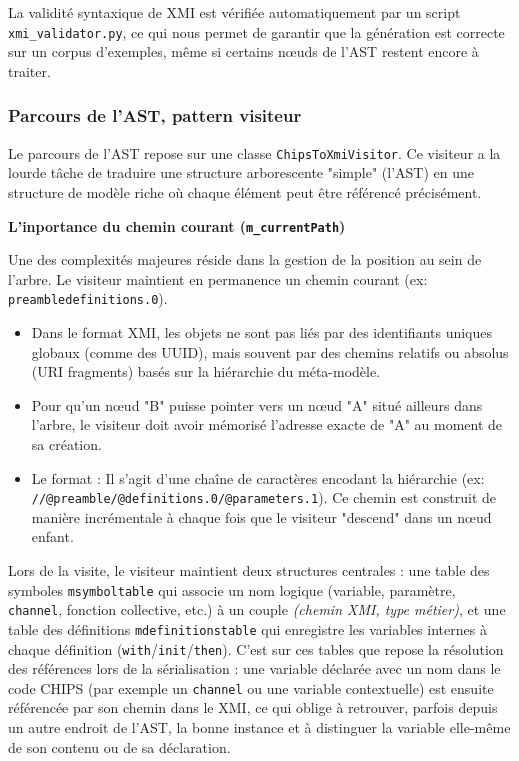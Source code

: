 \documentclass[a4paper, 11pt]{article}
\DeclareRobustCommand{\prog}[1]{\begingroup\urlstyle{tt}\nolinkurl{#1}\endgroup}
\begin{document}
La validité syntaxique de XMI est vérifiée automatiquement par un script \prog{xmi\_validator.py}, ce qui nous permet de garantir que la génération est correcte sur un corpus d’exemples, même si certains nœuds de l’AST restent encore à traiter.

\subsubsection{Parcours de l'AST, pattern visiteur}

Le parcours de l'AST repose sur une classe \prog{ChipsToXmiVisitor}. Ce visiteur a la lourde tâche de traduire une structure arborescente "simple" (l'AST) en une structure de modèle riche où chaque élément peut être référencé précisément.

\textbf{L'inportance du chemin courant (\prog{m\_currentPath})}

Une des complexités majeures réside dans la gestion de la position au sein de l'arbre. Le visiteur maintient en permanence un chemin courant (ex: \prog{preambledefinitions.0}).

\begin{itemize}
    \item Dans le format XMI, les objets ne sont pas liés par des identifiants uniques globaux (comme des UUID), mais souvent par des chemins relatifs ou absolus (URI fragments) basés sur la hiérarchie du méta-modèle.
    \item Pour qu'un nœud "B" puisse pointer vers un nœud "A" situé ailleurs dans l'arbre, le visiteur doit avoir mémorisé l'adresse exacte de "A" au moment de sa création.
    \item Le format : Il s'agit d'une chaîne de caractères encodant la hiérarchie \newline (ex: \prog{//@preamble/@definitions.0/@parameters.1}). Ce chemin est construit de manière incrémentale à chaque fois que le visiteur "descend" dans un nœud enfant.
\end{itemize}

Lors de la visite, le visiteur maintient deux structures centrales : une table des symboles \prog{msymboltable} qui associe un nom logique (variable, paramètre, \prog{channel}, fonction collective, etc.) à un couple \emph{(chemin XMI, type métier)}, et une table des définitions \prog{mdefinitionstable} qui enregistre les variables internes à chaque définition (\prog{with}/\prog{init}/\prog{then}). C’est sur ces tables que repose la résolution des références lors de la sérialisation : une variable déclarée avec un nom dans le code CHIPS (par exemple un \prog{channel} ou une variable contextuelle) est ensuite référencée par son chemin dans le XMI, ce qui oblige à retrouver, parfois depuis un autre endroit de l’AST, la bonne instance et à distinguer la variable elle-même de son contenu ou de sa déclaration.
\end{document}
